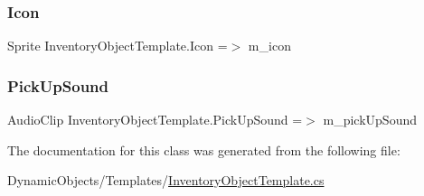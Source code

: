 \subsubsection{\texorpdfstring{Icon}{Icon}}
{\footnotesize\ttfamily Sprite Inventory\+Object\+Template.\+Icon =$>$ m\+\_\+icon}

\mbox{\label{class_inventory_object_template_aad1e883e7f75ff3fc38c53db9ec5b67a}} 
\subsubsection{\texorpdfstring{Pick\+Up\+Sound}{PickUpSound}}
{\footnotesize\ttfamily Audio\+Clip Inventory\+Object\+Template.\+Pick\+Up\+Sound =$>$ m\+\_\+pick\+Up\+Sound}



The documentation for this class was generated from the following file\+:\begin{DoxyCompactItemize}
\item 
Dynamic\+Objects/\+Templates/\mbox{\hyperlink{_inventory_object_template_8cs}{Inventory\+Object\+Template.\+cs}}\end{DoxyCompactItemize}

